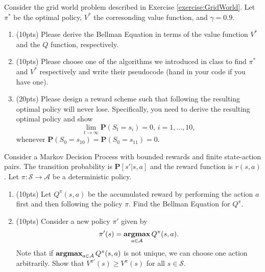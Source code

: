 \documentclass[11pt,letter,notitlepage]{article}
\DeclareMathOperator*{\argmax}{\bf argmax}
\begin{document}
\newpage
\begin{exercise}
	Consider the grid world problem described in Exercise \ref{exercise:GridWorld}. Let $\pi^*$ be the optimal policy, $V^*$ the corresonding value function, and $\gamma=0.9$. 

	\begin{enumerate}
		\item (10pts) Please derive the Bellman Equation in terms of the value function $V^*$ and the $Q$ function, respectively.
		
		\item (10pts) Please choose one of the algorithms we introduced in class to find $\pi^*$ and $V^*$ respectively and write their pseudocode (hand in your code if you have one).
		
		\item (20pts) Please design a reward scheme such that following the resulting optimal policy will never lose. Specifically, you need to derive the resulting optimal policy and show  $$\lim_{t\rightarrow\infty}\mathbf{P}(S_t=s_i)=0,\,i=1,\ldots,10,$$
		whenever $\mathbf{P}(S_0=s_{10})=\mathbf{P}(S_0=s_{11})=0$.
	\end{enumerate}
	
	
\end{exercise}

\newpage

\begin{exercise}
    Consider a Markov Decision Process with bounded rewards and finite state-action pairs. The transition probability is $\mathbf{P}[s'|s,a]$ and the reward function is $r(s,a)$. Let $\pi:\mathcal{S}\rightarrow\mathcal{A}$ be a deterministic policy.
    \begin{enumerate}
        \item (10pts) Let $Q^\pi (s,a)$ be the accumulated reward by performing the action $a$ first and then following the policy $\pi$. Find the Bellman Equation for $Q^\pi$.
        \item (10pts) Consider a new policy $\pi'$ given by
        \begin{align*}
            \pi'(s)=\argmax_{a\in\mathcal{A}} Q^\pi(s,a).
        \end{align*}
        Note that if $\argmax_{a\in\mathcal{A}} Q^\pi(s,a)$ is not unique, we can choose one action arbitrarily. Show that  $V^{\pi'}(s) \geq V^\pi(s)$ for all $s\in \mathcal{S}$.
    \end{enumerate}
\end{exercise}





% 
%

\end{document}
